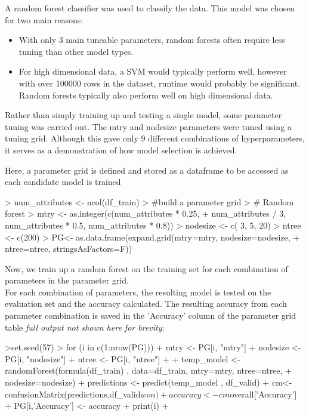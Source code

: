 \documentclass[10pt]{article}
\begin{document}
A random forest classifier was used to classify the data. This model was chosen for two main reasons:
\begin{itemize}
  \item With only 3 main tuneable parameters, random forests often require less tuning than other model types.
  \item For high dimensional data, a SVM would typically perform well, however with over 100000 rows in the dataset, runtime would probably be significant. Random forests typically also perform well on high dimensional data. \cite{GENUER201728}
\end{itemize}


Rather than simply training up and testing a single model, some parameter tuning was carried out. The mtry and nodesize parameters were tuned using a tuning grid. Although this gave only 9 different combinations of hyperparameters, it serves as a demonstration of how model selection is achieved.

Here, a parameter grid is defined and stored as a dataframe to be accessed as each candidate model is trained
\hspace{1cm} 
\begin{Schunk}
\begin{Sinput}
> num_attributes <- ncol(df_train)
> #build a parameter grid
> # Random forest
> mtry <- as.integer(c(num_attributes * 0.25,
+	 num_attributes / 3, num_attributes * 0.5, num_attributes * 0.8))
> nodesize <- c( 3, 5, 20)
> ntree <- c(200)
> PG<- as.data.frame(expand.grid(mtry=mtry, nodesize=nodesize,
+                                          ntree=ntree, stringsAsFactors=F))
\end{Sinput}
\end{Schunk}
\hspace{1cm} 
Now, we train up a random forest on the training set for each combination of parameters in the parameter grid. \\
For each combination of parameters, the resulting model is tested on the evaluation set and the accuracy calculated.
The resulting accuracy from each parameter combination is saved in the 'Accuracy' column of the parameter grid table \textit{full output not shown here for brevity}:
\hspace{1cm} 
\begin{Schunk}
\begin{Sinput}
>set.seed(57)
> for (i in c(1:nrow(PG))){
+   mtry <- PG[i, "mtry"]
+   nodesize <- PG[i, "nodesize"]
+   ntree <- PG[i, "ntree"]
+ 
+   temp_model <- randomForest(formula(df_train) , data=df_train, mtry=mtry, ntree=ntree,
+	 nodesize=nodesize)
+   predictions <- predict(temp_model , df_valid)
+   cm<- confusionMatrix(predictions,df_valid$won)
+   accuracy <- cm$overall['Accuracy']
+   PG[i,'Accuracy'] <- accuracy
+   print(i)
+ }
\end{Sinput}

\end{Schunk}
\hspace{1cm} 
\end{document}
